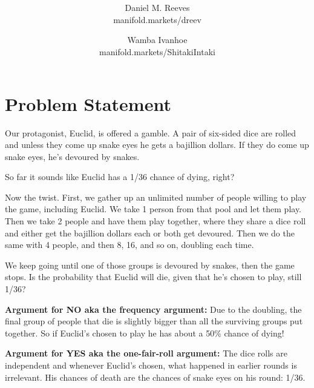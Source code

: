 \documentclass[article,twocolumn]{memoir}
\title{\HUGE\textbf{\longtitle}}
\author{Daniel M. Reeves\\manifold.markets/dreev
\and
Wamba Ivanhoe\\manifold.markets/ShitakiIntaki
}
\date{\protect\tstamp} %
\newcommand{\shorttitle}{Snake Eyes} %
\begin{document}
\pagestyle{headings}
\makeoddhead{headings}{\MakeUppercase{\shorttitle}}{}{\thepage}
\maketitle


\chapter{Problem Statement}

Our protagonist, Euclid, is offered a gamble.
A pair of six-sided dice are rolled and unless they come up snake eyes he gets a bajillion dollars.
If they do come up snake eyes, he's devoured by snakes.

So far it sounds like Euclid has a 1/36 chance of dying, right?

Now the twist. 
First, we gather up an unlimited number of people willing to play the game, including Euclid.
We take 1 person from that pool and let them play.
Then we take 2 people and have them play together, where they share a dice roll and either get the bajillion dollars each or both get devoured.
Then we do the same with 4 people, and then 8, 16, and so on, doubling each time.

We keep going until one of those groups is devoured by snakes, then the game stops.
Is the probability that Euclid will die, given that he's chosen to play, still 1/36?

\vspace{1em}

\textbf{Argument for NO aka the frequency argument:}
Due to the doubling, the final group of people that die is slightly bigger than all the surviving groups put together. 
So if Euclid's chosen to play he has about a 50\% chance of dying!

\vspace{1em}

\textbf{Argument for YES aka the one-fair-roll argument:}
The dice rolls are independent and whenever Euclid's chosen, what happened in earlier rounds is irrelevant.
His chances of death are the chances of snake eyes on his round: 1/36.
\end{document}
